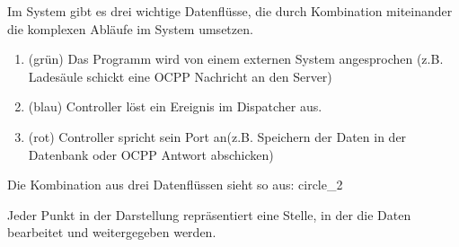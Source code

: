 Im System gibt es drei wichtige Datenflüsse, die durch Kombination miteinander die komplexen Abläufe im System umsetzen.
\begin{enumerate}
    \item (grün) Das Programm wird von einem externen System angesprochen (z.B. Ladesäule schickt eine OCPP Nachricht an den Server) 
    \item (blau) Controller löst ein Ereignis im Dispatcher aus.
    \item (rot) Controller spricht sein Port an(z.B. Speichern der Daten in der Datenbank oder OCPP Antwort abschicken)
\end{enumerate}
Die Kombination aus drei Datenflüssen sieht so aus:
{circle_2}

Jeder Punkt in der Darstellung repräsentiert eine Stelle, in der die Daten bearbeitet und weitergegeben werden.
